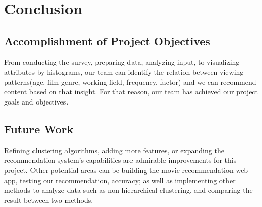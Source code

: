 \section{Conclusion}

    \subsection{Accomplishment of Project Objectives}
    From conducting the survey, preparing data, analyzing input, to visualizing attributes by histograms, our team can identify the relation between viewing patterns(age, film genre, working field, frequency, factor) and we can recommend content based on that insight. For that reason, our team has achieved our project goals and objectives.
    
    \subsection{Future Work}
    Refining clustering algorithms, adding more features, or expanding the recommendation system's capabilities are admirable improvements for this project. Other potential areas can be building the movie recommendation web app, testing our recommendation, accuracy; as well as implementing other methods to analyze data such as non-hierarchical clustering, and comparing the result between two methods. 



    